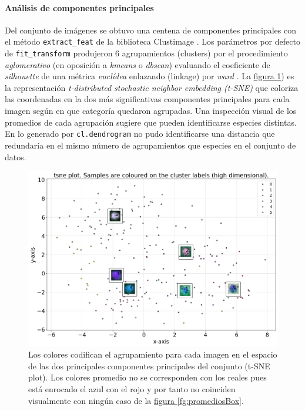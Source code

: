 \documentclass{article}
\begin{document}

\paragraph{Análisis de componentes principales}
Del conjunto de imágenes se obtuvo una centena de componentes principales con el método \verb'extract_feat' de la biblioteca Clustimage \cite{taskesen_pca_2020}.
Los parámetros por defecto de \verb`fit_transform` produjeron 6 agrupamientos (clusters) por el procedimiento \emph{aglomerativo} (en oposición a \emph{kmeans} o \emph{dbscan}) evaluando el coeficiente de \emph{silhouette} de una métrica \emph{euclídea} enlazando (linkage) por \emph{ward} \cite{noauthor_api_nodate}.
La \hyperref[fg:tsne]{figura \ref*{fg:tsne}}) es la representación \emph{t-distributed stochastic neighbor embedding (t-SNE)} que coloriza las coordenadas en la dos más significativas componentes principales para cada imagen según en que categoría quedaron agrupadas.
Una inspección visual de los promedios de cada agrupación sugiere que pueden identificarse especies distintas.
En lo generado por \verb'cl.dendrogram' no pudo identificarse una distancia que redundaría en el mismo número de agrupamientos que especies en el conjunto de datos.



\begin{figure}
  \centering
  \includegraphics[width= 0.8\linewidth]{tsne}
  \caption{Los colores codifican el agrupamiento para cada imagen en el espacio de las dos principales componentes principales del conjunto (t-SNE plot). Los colores promedio no se corresponden con los reales pues está enrocado el azul con el rojo y por tanto no coinciden visualmente con ningún caso de la \hyperref[fg:promediosBox]{figura \ref*{fg:promediosBox}}.}
	\label{fg:tsne}
\end{figure}


\printbibliography[title= Referencias, heading=bibintoc]
\end{document}
